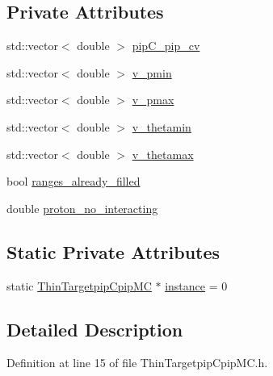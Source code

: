 \subsection*{Private Attributes}
\begin{DoxyCompactItemize}
\item 
std\-::vector$<$ double $>$ \hyperlink{class_neutrino_flux_reweight_1_1_thin_targetpip_cpip_m_c_ad8949d3657924de68ffab295b47b9ae5}{pip\-C\-\_\-pip\-\_\-cv}
\item 
std\-::vector$<$ double $>$ \hyperlink{class_neutrino_flux_reweight_1_1_thin_targetpip_cpip_m_c_acfe77250a611ddad7eff49870fc1cc79}{v\-\_\-pmin}
\item 
std\-::vector$<$ double $>$ \hyperlink{class_neutrino_flux_reweight_1_1_thin_targetpip_cpip_m_c_a49368fcb9ec3b6fe7aa1da61b3f12599}{v\-\_\-pmax}
\item 
std\-::vector$<$ double $>$ \hyperlink{class_neutrino_flux_reweight_1_1_thin_targetpip_cpip_m_c_adbd4423fe4ede8e69dc1019fd3988c40}{v\-\_\-thetamin}
\item 
std\-::vector$<$ double $>$ \hyperlink{class_neutrino_flux_reweight_1_1_thin_targetpip_cpip_m_c_a338bfb845380a4c3badcb591821b8da0}{v\-\_\-thetamax}
\item 
bool \hyperlink{class_neutrino_flux_reweight_1_1_thin_targetpip_cpip_m_c_a59e7329b684e22bda7a4f31bdcbc081e}{ranges\-\_\-already\-\_\-filled}
\item 
double \hyperlink{class_neutrino_flux_reweight_1_1_thin_targetpip_cpip_m_c_af1401652ebb4999718169c922b97a5f9}{proton\-\_\-no\-\_\-interacting}
\end{DoxyCompactItemize}
\subsection*{Static Private Attributes}
\begin{DoxyCompactItemize}
\item 
static \hyperlink{class_neutrino_flux_reweight_1_1_thin_targetpip_cpip_m_c}{Thin\-Targetpip\-Cpip\-M\-C} $\ast$ \hyperlink{class_neutrino_flux_reweight_1_1_thin_targetpip_cpip_m_c_a1d7a0728112de7b2ec773be8e7e1e44a}{instance} = 0
\end{DoxyCompactItemize}


\subsection{Detailed Description}


Definition at line 15 of file Thin\-Targetpip\-Cpip\-M\-C.\-h.




